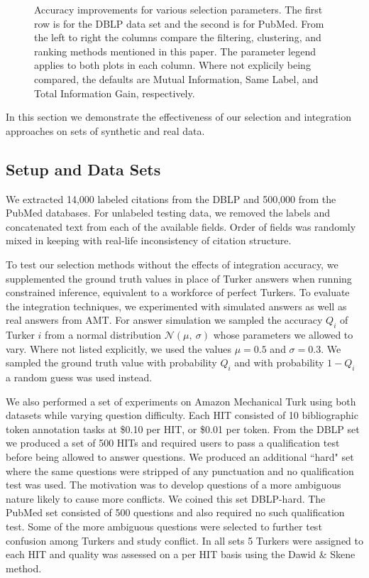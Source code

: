 \begin{figure}[t]
{        \label{fig:first6}
    }
    \caption{Accuracy improvements for various selection parameters.  The first row is for the DBLP data set and the second is for PubMed.  From the left to right the columns compare the filtering, clustering, and ranking methods mentioned in this paper.  The parameter legend applies to both plots in each column.  Where not explicily being compared, the defaults are Mutual Information, Same Label, and Total Information Gain, respectively.}
    \label{fig:selectionExp}
\end{figure}

In this section we demonstrate the effectiveness of our selection and integration approaches on sets of synthetic and real data.  

\subsection{Setup and Data Sets}
\label{sec:setup}

We extracted 14,000 labeled citations from the DBLP\footnotemark{} and 500,000 from the PubMed\footnotemark{} databases.  For unlabeled testing data, we removed the labels and concatenated text from each of the available fields.  Order of fields was randomly mixed in keeping with real-life inconsistency of citation structure.

To test our selection methods without the effects of integration accuracy, we supplemented the ground truth values in place of Turker answers when running constrained inference, equivalent to a workforce of perfect Turkers.  To evaluate the integration techniques, we experimented with simulated answers as well as real answers from AMT.  For answer simulation we sampled the accuracy $Q_{i}$ of Turker $i$ from a normal distribution $\mathcal{N}(\mu,~\sigma)$ whose parameters we allowed to vary.  Where not listed explicitly, we used the values $\mu=0.5$ and $\sigma=0.3$.  We sampled the ground truth value with probability $Q_{i}$ and with probability $1-Q_{i}$ a random guess was used instead.

We also performed a set of experiments on Amazon Mechanical Turk using both datasets while varying question difficulty.  Each HIT consisted of 10 bibliographic token annotation tasks at \$0.10 per HIT, or \$0.01 per token. From the DBLP set we produced a set of 500 HITs and required users to pass a qualification test before being allowed to answer questions.  We produced an additional ``hard" set where the same questions were stripped of any punctuation and no qualification test was used.  The motivation was to develop questions of a more ambiguous nature likely to cause more conflicts.  We coined this set DBLP-hard.  The PubMed set consisted of 500 questions and also required no such qualification test.  Some of the more ambiguous questions were selected to further test confusion among Turkers and study conflict.  In all sets 5 Turkers were assigned to each HIT and quality was assessed on a per HIT basis using the Dawid \& Skene method.

